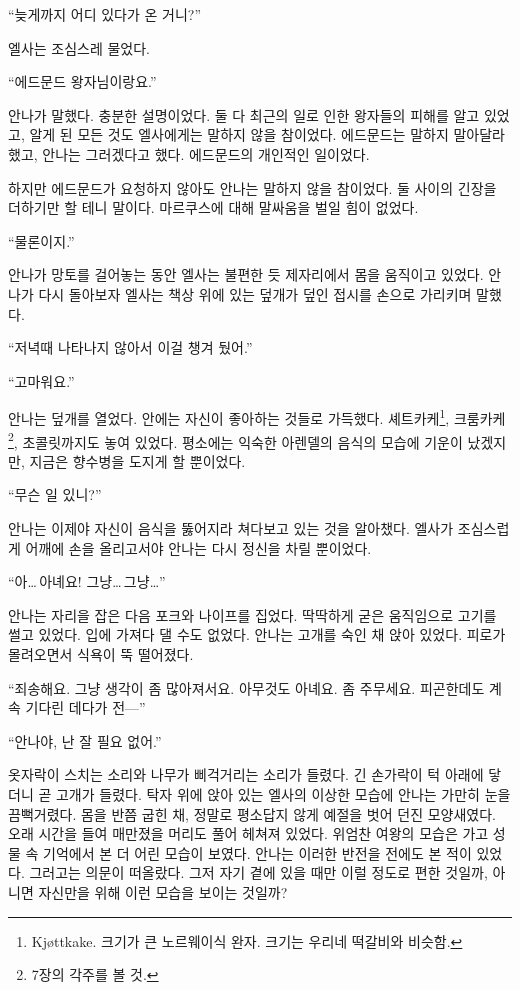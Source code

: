 ``늦게까지 어디 있다가 온 거니?''

엘사는 조심스레 물었다.

``에드문드 왕자님이랑요.''

안나가 말했다. 충분한 설명이었다. 둘 다 최근의 일로 인한 왕자들의 피해를 알고 있었고, 알게 된 모든 것도 엘사에게는 말하지 않을 참이었다. 에드문드는 말하지 말아달라 했고, 안나는 그러겠다고 했다. 에드문드의 개인적인 일이었다.

하지만 에드문드가 요청하지 않아도 안나는 말하지 않을 참이었다. 둘 사이의 긴장을 더하기만 할 테니 말이다. 마르쿠스에 대해 말싸움을 벌일 힘이 없었다.

``물론이지.''

안나가 망토를 걸어놓는 동안 엘사는 불편한 듯 제자리에서 몸을 움직이고 있었다. 안나가 다시 돌아보자 엘사는 책상 위에 있는 덮개가 덮인 접시를 손으로 가리키며 말했다.

``저녁때 나타나지 않아서 이걸 챙겨 뒀어.''

``고마워요.''

안나는 덮개를 열었다. 안에는 자신이 좋아하는 것들로 가득했다. 셰트카케\footnote{Kjøttkake. 크기가 큰 노르웨이식 완자. 크기는 우리네 떡갈비와 비슷함.}, 크룸카케\footnote{7장의 각주를 볼 것.}, 초콜릿까지도 놓여 있었다. 평소에는 익숙한 아렌델의 음식의 모습에 기운이 났겠지만, 지금은 향수병을 도지게 할 뿐이었다.

``무슨 일 있니?''

안나는 이제야 자신이 음식을 뚫어지라 쳐다보고 있는 것을 알아챘다. 엘사가 조심스럽게 어깨에 손을 올리고서야 안나는 다시 정신을 차릴 뿐이었다.

``아\ldots\,아녜요! 그냥\ldots\,그냥\ldots''

안나는 자리을 잡은 다음 포크와 나이프를 집었다. 딱딱하게 굳은 움직임으로 고기를 썰고 있었다. 입에 가져다 댈 수도 없었다. 안나는 고개를 숙인 채 앉아 있었다. 피로가 몰려오면서 식욕이 뚝 떨어졌다.

``죄송해요. 그냥 생각이 좀 많아져서요. 아무것도 아녜요. 좀 주무세요. 피곤한데도 계속 기다린 데다가 전—''

``안나야, 난 잘 필요 없어.''

옷자락이 스치는 소리와 나무가 삐걱거리는 소리가 들렸다. 긴 손가락이 턱 아래에 닿더니 곧 고개가 들렸다. 탁자 위에 앉아 있는 엘사의 이상한 모습에 안나는 가만히 눈을 끔뻑거렸다. 몸을 반쯤 굽힌 채, 정말로 평소답지 않게 예절을 벗어 던진 모양새였다. 오래 시간을 들여 매만졌을 머리도 풀어 헤쳐져 있었다. 위엄찬 여왕의 모습은 가고 성물 속 기억에서 본 더 어린 모습이 보였다. 안나는 이러한 반전을 전에도 본 적이 있었다. 그러고는 의문이 떠올랐다. 그저 자기 곁에 있을 때만 이럴 정도로 편한 것일까, 아니면 자신만을 위해 이런 모습을 보이는 것일까?

